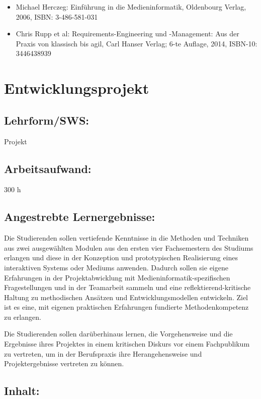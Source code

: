 \begin{itemize}
\item
  Michael Herczeg: Einführung in die Medieninformatik, Oldenbourg
  Verlag, 2006, ISBN: 3-486-581-031
\item
  Chris Rupp et al: Requirements-Engineering und -Management: Aus der
  Praxis von klassisch bis agil, Carl Hanser Verlag; 6-te Auflage, 2014,
  ISBN-10: 3446438939
\end{itemize}

\chapter{Entwicklungsprojekt}\label{entwicklungsprojekt}

\section*{Lehrform/SWS:}\label{lehrformsws-6}

Projekt

\section*{Arbeitsaufwand:}\label{arbeitsaufwand-6}

300 h

\section*{Angestrebte
Lernergebnisse:}\label{angestrebte-lernergebnisse-10}

Die Studierenden sollen vertiefende Kenntnisse in die Methoden und
Techniken aus zwei ausgewählten Modulen aus den ersten vier
Fachsemestern des Studiums erlangen und diese in der Konzeption und
prototypischen Realisierung eines interaktiven Systems oder Mediums
anwenden. Dadurch sollen sie eigene Erfahrungen in der Projektabwicklung
mit Medieninformatik-spezifischen Fragestellungen und in der Teamarbeit
sammeln und eine reflektierend-kritische Haltung zu methodischen
Ansätzen und Entwicklungsmodellen entwickeln. Ziel ist es eine, mit
eigenen praktischen Erfahrungen fundierte Methodenkompetenz zu erlangen.

Die Studierenden sollen darüberhinaus lernen, die Vorgehensweise und die
Ergebnisse ihres Projektes in einem kritischen Diskurs vor einem
Fachpublikum zu vertreten, um in der Berufspraxis ihre Herangehensweise
und Projektergebnisse vertreten zu können.

\section*{Inhalt:}\label{inhalt-10}

